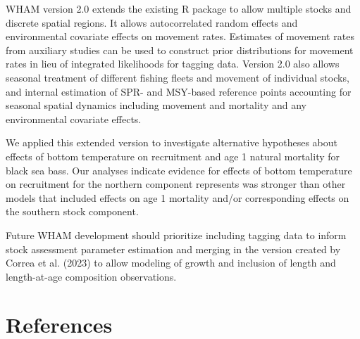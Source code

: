 \documentclass[
]{article}
\begin{document}
WHAM version 2.0 extends the existing R package to allow multiple stocks
and discrete spatial regions. It allows autocorrelated random effects
and environmental covariate effects on movement rates. Estimates of
movement rates from auxiliary studies can be used to construct prior
distributions for movement rates in lieu of integrated likelihoods for
tagging data. Version 2.0 also allows seasonal treatment of different
fishing fleets and movement of individual stocks, and internal
estimation of SPR- and MSY-based reference points accounting for
seasonal spatial dynamics including movement and mortality and any
environmental covariate effects.

We applied this extended version to investigate alternative hypotheses
about effects of bottom temperature on recruitment and age 1 natural
mortality for black sea bass. Our analyses indicate evidence for effects
of bottom temperature on recruitment for the northern component
represents was stronger than other models that included effects on age 1
mortality and/or corresponding effects on the southern stock component.

Future WHAM development should prioritize including tagging data to
inform stock assessment parameter estimation and merging in the version
created by Correa et al. (2023) to allow modeling of growth and
inclusion of length and length-at-age composition observations.

\hypertarget{references}{%
\section*{References}\label{references}}
\end{document}
